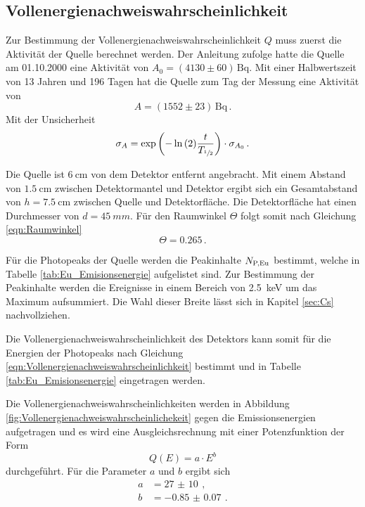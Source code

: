 \subsection{Vollenergienachweiswahrscheinlichkeit}

Zur Bestimmung der Vollenergienachweiswahrscheinlichkeit $Q$ muss zuerst die Aktivität der  Quelle berechnet werden.
Der Anleitung zufolge hatte die Quelle am 01.10.2000 eine Aktivität von $A_\text{0} = (4130 \pm 60)\,\si{\becquerel}$.
Mit einer Halbwertszeit von 13 Jahren und 196 Tagen hat die Quelle zum Tag der Messung eine Aktivität von
\begin{equation*}
  A = (1552 \pm 23)\,\si{\becquerel}\,.
\end{equation*}
Mit der Unsicherheit
\begin{equation*}
  \sigma_A = \exp{\left(-\ln{(2)} \frac{t}{T_{\sfrac{1}{2}}}\right)} \cdot \sigma_{A_0} \, .
\end{equation*}

Die Quelle ist $\SI{6}{\centi\meter}$ von dem Detektor entfernt angebracht. Mit einem Abstand von $\SI{1.5}{\centi\meter}$ zwischen Detektormantel und Detektor ergibt sich ein Gesamtabstand von $h = \SI{7.5}{\centi\meter}$ zwischen Quelle und Detektorfläche.
Die Detektorfläche hat einen Durchmesser von $d = \SI{45}{mm}$.
Für den Raumwinkel $\Theta$ folgt somit nach Gleichung \eqref{eqn:Raumwinkel}
\begin{equation*}
   \Theta = \num{0.265} \, .
\end{equation*}

Für die Photopeaks der  Quelle werden die Peakinhalte $N_\text{P,\ce{Eu}}$ bestimmt, welche in Tabelle \ref{tab:Eu_Emisionsenergie} aufgelistet sind.
Zur Bestimmung der Peakinhalte werden die Ereignisse in einem Bereich von \SI{2.5}{\kilo\electronvolt} um das Maximum aufsummiert. Die Wahl dieser Breite lässt sich in Kapitel \ref{sec:Cs} nachvollziehen.

Die Vollenergienachweiswahrscheinlichkeit des Detektors kann somit für die Energien der Photopeaks nach Gleichung \ref{eqn:Vollenergienachweiswahrscheinlichkeit} bestimmt und in Tabelle \ref{tab:Eu_Emisionsenergie} eingetragen werden.

Die Vollenergienachweiswahrscheinlichkeiten werden in Abbildung \ref{fig:Vollenergienachweiswahrscheinlichekeit} gegen die Emissionsenergien aufgetragen und es wird eine Ausgleichsrechnung mit einer Potenzfunktion der Form
\begin{equation*}
  Q(E) = a \cdot E^b
\end{equation*}
durchgeführt.
Für die Parameter $a$ und $b$ ergibt sich
\begin{align*}
   a &=  \SI{27(10)}{}\, ,\\
   b &=  \SI{-0.85(7)}{}\, .\\
\end{align*}

